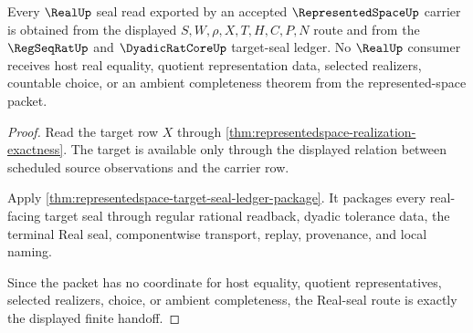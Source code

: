 \begin{theorem}
\label{thm:representedspace-root-real-seal-obligations}
Every $\RealUp$ seal read exported by an accepted $\RepresentedSpaceUp$ carrier is obtained from the displayed $S,W,\rho,X,T,H,C,P,N$ route and from the $\RegSeqRatUp$ and $\DyadicRatCoreUp$ target-seal ledger. No $\RealUp$ consumer receives host real equality, quotient representation data, selected realizers, countable choice, or an ambient completeness theorem from the represented-space packet.
\end{theorem}
\begin{proof}
Read the target row $X$ through \autoref{thm:representedspace-realization-exactness}. The target is available only through the displayed relation between scheduled source observations and the carrier row.

Apply \autoref{thm:representedspace-target-seal-ledger-package}. It packages every real-facing target seal through regular rational readback, dyadic tolerance data, the terminal Real seal, componentwise transport, replay, provenance, and local naming.

Since the packet has no coordinate for host equality, quotient representatives, selected realizers, choice, or ambient completeness, the Real-seal route is exactly the displayed finite handoff.
\end{proof}

